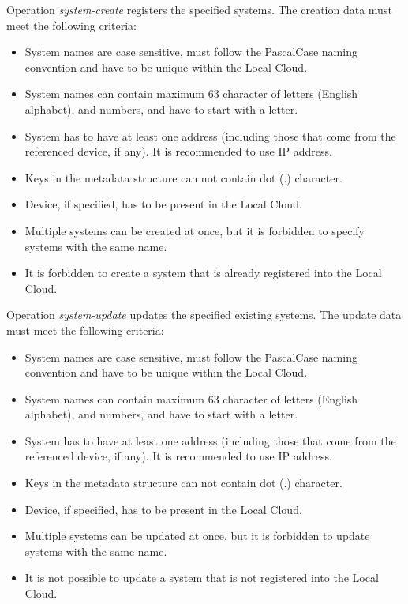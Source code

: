 \documentclass[a4paper]{arrowhead}
\begin{document}

Operation \textit{system-create} registers the specified systems. The creation data must meet the following criteria:

\begin{itemize}
    \item System names are case sensitive, must follow the PascalCase naming convention and have to be unique within the Local Cloud.
    \item System names can contain maximum 63 character of letters (English alphabet), and numbers, and have to start with a letter.
    \item System has to have at least one address (including those that come from the referenced device, if any). It is recommended to use IP address. 
    \item Keys in the metadata structure can not contain dot (.) character.
    \item Device, if specified, has to be present in the Local Cloud.
    \item Multiple systems can be created at once, but it is forbidden to specify systems with the same name.
    \item It is forbidden to create a system that is already registered into the Local Cloud.
\end{itemize}


Operation \textit{system-update} updates the specified existing systems. The update data must meet the following criteria:

\begin{itemize}
    \item System names are case sensitive, must follow the PascalCase naming convention and have to be unique within the Local Cloud.
    \item System names can contain maximum 63 character of letters (English alphabet), and numbers, and have to start with a letter.
    \item System has to have at least one address (including those that come from the referenced device, if any). It is recommended to use IP address. 
    \item Keys in the metadata structure can not contain dot (.) character.
    \item Device, if specified, has to be present in the Local Cloud.
    \item Multiple systems can be updated at once, but it is forbidden to update systems with the same name.
    \item It is not possible to update a system that is not registered into the Local Cloud.
\end{itemize}
\end{document}
